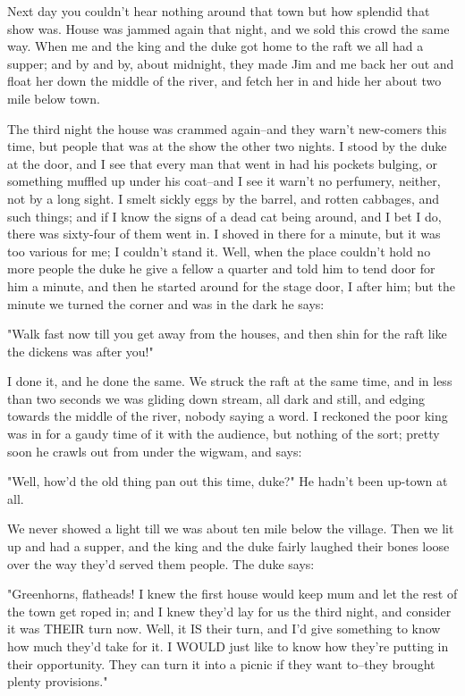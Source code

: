 Next day you couldn't hear nothing around that town but how splendid that
show was.  House was jammed again that night, and we sold this crowd the
same way.  When me and the king and the duke got home to the raft we all
had a supper; and by and by, about midnight, they made Jim and me back
her out and float her down the middle of the river, and fetch her in and
hide her about two mile below town.

The third night the house was crammed again--and they warn't new-comers
this time, but people that was at the show the other two nights.  I stood
by the duke at the door, and I see that every man that went in had his
pockets bulging, or something muffled up under his coat--and I see it
warn't no perfumery, neither, not by a long sight.  I smelt sickly eggs
by the barrel, and rotten cabbages, and such things; and if I know the
signs of a dead cat being around, and I bet I do, there was sixty-four of
them went in.  I shoved in there for a minute, but it was too various for
me; I couldn't stand it.  Well, when the place couldn't hold no more
people the duke he give a fellow a quarter and told him to tend door for
him a minute, and then he started around for the stage door, I after him;
but the minute we turned the corner and was in the dark he says:

"Walk fast now till you get away from the houses, and then shin for the
raft like the dickens was after you!"

I done it, and he done the same.  We struck the raft at the same time,
and in less than two seconds we was gliding down stream, all dark and
still, and edging towards the middle of the river, nobody saying a word.
I reckoned the poor king was in for a gaudy time of it with the audience,
but nothing of the sort; pretty soon he crawls out from under the wigwam,
and says:

"Well, how'd the old thing pan out this time, duke?"  He hadn't been
up-town at all.

We never showed a light till we was about ten mile below the village.
Then we lit up and had a supper, and the king and the duke fairly laughed
their bones loose over the way they'd served them people.  The duke says:

"Greenhorns, flatheads!  I knew the first house would keep mum and let
the rest of the town get roped in; and I knew they'd lay for us the third
night, and consider it was THEIR turn now.  Well, it IS their turn, and
I'd give something to know how much they'd take for it.  I WOULD just
like to know how they're putting in their opportunity.  They can turn it
into a picnic if they want to--they brought plenty provisions."

